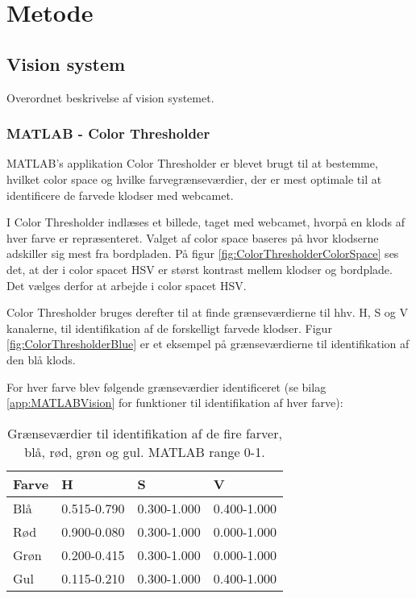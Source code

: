 \chapter{Metode}\label{chap:Metode}

\section{Vision system}
Overordnet beskrivelse af vision systemet.

\subsection{MATLAB - Color Thresholder}
MATLAB's  applikation Color Thresholder er blevet brugt til at bestemme, hvilket color space og hvilke farvegrænseværdier, der er mest optimale til at identificere de farvede klodser med webcamet.

I Color Thresholder indlæses et billede, taget med webcamet, hvorpå en klods af hver farve er repræsenteret.
Valget af color space baseres på hvor klodserne adskiller sig mest fra bordpladen.
På figur \vref{fig:ColorThresholderColorSpace} ses det, at der i color spacet HSV er størst kontrast mellem klodser og bordplade.
Det vælges derfor at arbejde i color spacet HSV.


Color Thresholder bruges derefter til at finde grænseværdierne til hhv. H, S og V kanalerne, til identifikation af de forskelligt farvede klodser.
Figur \vref{fig:ColorThresholderBlue} er et eksempel på grænseværdierne til identifikation af den blå klods.


For hver farve blev følgende grænseværdier identificeret (se bilag \vref{app:MATLABVision} for funktioner til identifikation af hver farve):
\begin{table}[H]
\centering
\begin{tabular}{l|l|l|l}
Farve	&	H			&	S			&	V\\
\hline
Blå		&	0.515-0.790	&	0.300-1.000	&	0.400-1.000\\
Rød		&	0.900-0.080	&	0.300-1.000	&	0.000-1.000\\
Grøn	&	0.200-0.415	&	0.300-1.000	&	0.000-1.000\\
Gul		&	0.115-0.210	&	0.300-1.000	&	0.400-1.000\\
\end{tabular}	
\caption{Grænseværdier til identifikation af de fire farver, blå, rød, grøn og gul. MATLAB range 0-1.}
\end{table}

